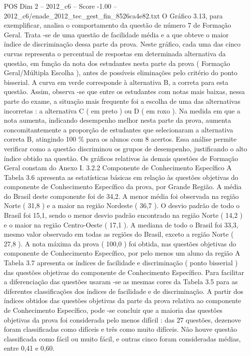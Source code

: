 \begin{textsample}{POS Dim 2 – 2012\_c6 – Score -1.00 – 2012\_c6/enade\_2012\_tec\_gest\_fin\_8526ca4e82.txt}
O Gráfico 3.13, para exemplificar, analisa o comportamento da questão de número 7 de Formação Geral.
Trata -se de uma questão de facilidade média e a que obteve o maior índice de discriminação dessa parte da prova.
Neste gráfico, cada uma das cinco curvas representa o percentual de respostas em determinada alternativa da questão, em função da nota dos estudantes nesta parte da prova ( Formação Geral/Múltipla Escolha ), antes de possíveis eliminações pelo critério do ponto bisserial.
A curva em verde corresponde à alternativa B, a correta para esta questão.
Assim, observa -se que entre os estudantes com notas mais baixas, nessa parte do exame, a situação mais frequente foi a escolha de uma das alternativas incorretas : a alternativa C ( em preto ) ou D ( em roxo ).
Na medida em que a nota aumenta, indicando desempenho melhor nesta parte da prova, aumenta concomitantemente a proporção de estudantes que selecionaram a alternativa correta B, atingindo 100 \% para os alunos com 8 acertos.
Essa análise permite verificar como a questão discriminou os grupos de desempenho, justificando o alto índice obtido na questão.
Os gráficos relativos às demais questões de Formação Geral constam do Anexo I. 3.2.2 Componente de Conhecimento Específico A Tabela 3.6 apresenta as estatísticas básicas em relação às questões objetivas do componente de Conhecimento Específico da prova, por Grande Região.
A média do Brasil deste componente foi de 34,2.
A menor média foi observada na região Norte ( 31,8 ) e a maior na região Nordeste ( 36,7 ).
O desvio padrão de todo o Brasil foi 15,1, sendo o menor desvio padrão encontrado na região Norte ( 14,2 ) e o maior na região Centro-Oeste ( 17,1 ).
A mediana de todo o Brasil foi 33,3, mesmo valor observado em todas as regiões do Brasil, exceto a região Norte ( 27,8 ).
A nota máxima da prova ( 100,0 ) foi obtida, nas questões objetivas do componente de Conhecimento Específico, por pelo menos um aluno da região A Tabela 3.7 apresenta os índices de facilidade e discriminação ( ponto bisserial ) das questões objetivas do componente de Conhecimento Específico.
Para facilitar a diferenciação das questões usaram -se as mesmas cores da Tabela 3.5 para as diferentes classificações dos índices de facilidade e de discriminação.
A partir dos índices obtidos das questões objetivas da parte da prova relativa ao componente de Conhecimento Específico, pode -se concluir que a maioria das questões objetivas da prova foi considerada pelo menos difícil : das 27 questões, dezenove foram classificadas como difíceis e três como muito difíceis.
Não houve questão classificada como fácil ou muito fácil, e outras cinco foram consideradas médias, entre 0,41 e 0,60.

\end{textsample}
